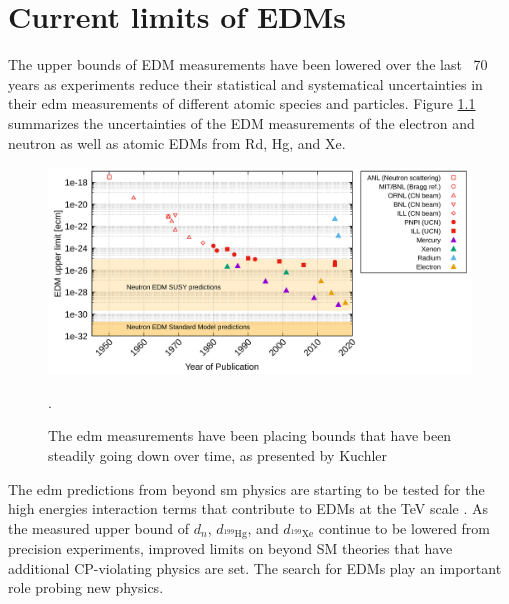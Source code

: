 \chapter{Current limits of EDMs}

The upper bounds of EDM measurements have been lowered over the last ~70 years as experiments reduce their statistical and systematical uncertainties in their \gls{edm} measurements of different atomic species and particles. Figure \ref{fig:EDMsearch} summarizes the uncertainties of the EDM measurements of the electron and neutron as well as atomic EDMs from Rd, Hg, and Xe.   

\begin{figure} [h!]
	\center
	\includegraphics[width=.8\textwidth]{EDM-searches.png}
	\caption { The \gls{edm} measurements have been placing bounds that have been steadily going down over time,  as presented by Kuchler \cite{Kuchler}}.
		\label{fig:EDMsearch}
\end{figure}

The \gls{edm} predictions from beyond \gls{sm} physics are starting to be tested for the high energies interaction terms that contribute to EDMs at the TeV scale \cite{Chupp2015}. As the measured upper bound of $d_n$, $d_{^199\textrm{Hg}}$, and $d_{^199\textrm{Xe}}$ continue to be lowered from precision experiments, improved limits on beyond SM theories that have additional CP-violating physics are set. The search for EDMs play an important role probing new physics.